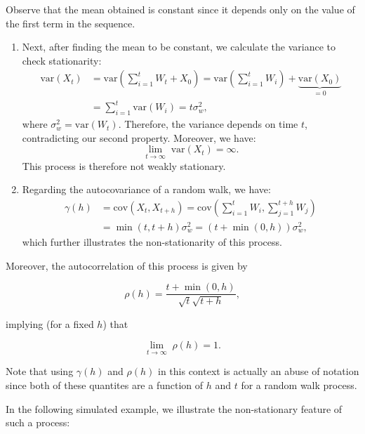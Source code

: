 \documentclass[]{book}
\theoremstyle{definition}
\theoremstyle{definition}
\theoremstyle{definition}
\theoremstyle{remark}
\begin{document}
Observe that the mean obtained is constant since it depends only on the
value of the first term in the sequence.

\begin{enumerate}
\def\labelenumi{\arabic{enumi}.}
\setcounter{enumi}{1}
\item
  Next, after finding the mean to be constant, we calculate the variance
  to check stationarity: \[\begin{aligned}
   \text{var}\left( {{X_t}} \right) &= \text{var}\left( {\sum\limits_{i = 1}^t {{W_t}}  + {X_0}} \right) 
   = \text{var}\left( {\sum\limits_{i = 1}^t {{W_i}} } \right) + \underbrace {\text{var}\left( {{X_0}} \right)}_{= 0} \\
   &= \sum\limits_{i = 1}^t {\text{var}\left( {{W_i}} \right)} 
   = t \sigma_w^2,
   \end{aligned}\] where \(\sigma_w^2 = \text{var}(W_t)\). Therefore,
  the variance depends on time \(t\), contradicting our second property.
  Moreover, we have:
  \[\mathop {\lim }\limits_{t \to \infty } \; \text{var}\left(X_t\right) = \infty.\]
  This process is therefore not weakly stationary.
\item
  Regarding the autocovariance of a random walk, we have:
  \[\begin{aligned}
   \gamma \left( h \right) &= \text{cov}\left( {{X_t},{X_{t + h}}} \right) 
   = \text{cov}\left( {\sum\limits_{i = 1}^t {{W_i}} ,\sum\limits_{j = 1}^{t + h} {{W_j}} } \right) \\ 
   &= \min \left( {t,t + h} \right)\sigma _w^2
   = \left( {t + \min \left( {0,h} \right)} \right)\sigma _w^2,
   \end{aligned} \] which further illustrates the non-stationarity of
  this process.
\end{enumerate}

Moreover, the autocorrelation of this process is given by

\[\rho (h) = \frac{t + \min \left( {0,h} \right)}{\sqrt{t}\sqrt{t+h}},\]

implying (for a fixed \(h\)) that

\[\mathop {\lim }\limits_{t \to \infty } \; \rho(h) = 1.\]

Note that using \(\gamma (h)\) and \(\rho (h)\) in this context is
actually an abuse of notation since both of these quantites are a
function of \(h\) and \(t\) for a random walk process.

In the following simulated example, we illustrate the non-stationary
feature of such a process:
\end{document}
